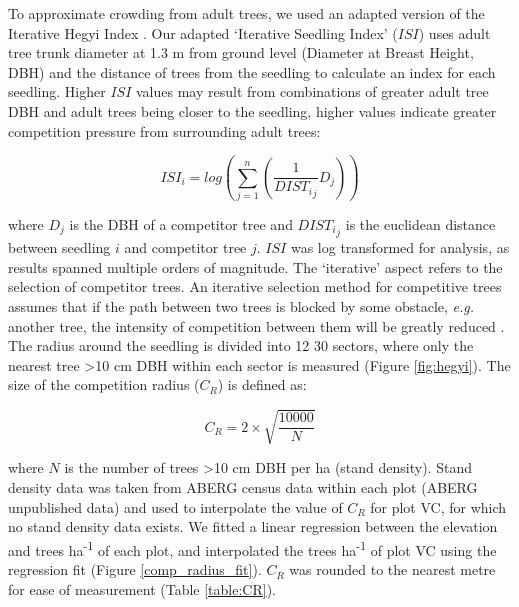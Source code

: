 \documentclass[a4paper, 11pt]{article}
\newcommand{\textapprox}{\raisebox{0.5ex}{\texttildelow}}
\begin{document}
To approximate crowding from adult trees, we used an adapted version of the Iterative Hegyi Index \citep{Hegyi1974, Lee2004, Seifert2014}. Our adapted `Iterative Seedling Index' ($ISI$) uses adult tree trunk diameter at \textapprox{}1.3 m from ground level (Diameter at Breast Height, DBH) and the distance of trees from the seedling to calculate an index for each seedling. Higher $ISI$ values may result from combinations of  greater adult tree DBH and adult trees being closer to the seedling, higher values indicate greater competition pressure from surrounding adult trees:

\begin{equation}
\label{eq:ISI}
ISI_i = log(\sum_{j=1}^n (\frac{1}{{DIST_i}_j} D_j))
\end{equation}

where $D_j$ is the DBH of a competitor tree and ${{DIST_i}_j}$ is the euclidean distance between seedling $i$ and competitor tree $j$. $ISI$ was log transformed for analysis, as results spanned multiple orders of magnitude. The `iterative' aspect refers to the selection of competitor trees. An iterative selection method for competitive trees assumes that if the path between two trees is blocked by some obstacle, \textit{e.g.} another tree, the intensity of competition between them will be greatly reduced \citep{Gadow1999}. The radius around the seedling is divided into 12 30\textdegree{} sectors, where only the nearest tree \textgreater{}10 cm DBH within each sector is measured (Figure \ref{fig:hegyi}). The size of the competition radius ($C_R$) is defined as:

\begin{equation}
\label{eq:CR}
C_R = 2 \times \sqrt{\frac{10000}{N}}
\end{equation}

where $N$ is the number of trees \textgreater10 cm DBH per ha (stand density). Stand density data was taken from ABERG census data within each plot (ABERG unpublished data) and used to interpolate the value of $C_R$ for plot VC, for which no stand density data exists. We fitted a linear regression between the elevation and trees ha\textsuperscript{-1} of each plot, and interpolated the trees ha\textsuperscript{-1} of plot VC using the regression fit (Figure \ref{comp_radius_fit}). $C_R$ was rounded to the nearest metre for ease of measurement (Table \ref{table:CR}). 
\end{document}
